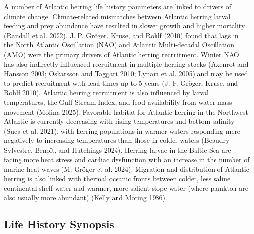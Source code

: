 \documentclass[
  letterpaper,
  DIV=11,
  numbers=noendperiod]{scrartcl}
\begin{document}
A number of Atlantic herring life history parameters are linked to
drivers of climate change. Climate-related mismatches between Atlantic
herring larval feeding and prey abundance have resulted in slower growth
and higher mortality (Randall et al. 2022). J. P. Gröger, Kruse, and
Rohlf (2010) found that lags in the North Atlantic Oscillation (NAO) and
Atlantic Multi-decadal Oscillation (AMO) were the primary drivers of
Atlantic herring recruitment. Winter NAO has also indirectly influenced
recruitment in multiple herring stocks (Axenrot and Hansson 2003;
Oskarsson and Taggart 2010; Lynam et al. 2005) and may be used to
predict recruitment with lead times up to 5 years (J. P. Gröger, Kruse,
and Rohlf 2010). Atlantic herring recruitment is also influenced by
larval temperatures, the Gulf Stream Index, and food availability from
water mass movement (Molina 2025). Favorable habitat for Atlantic
herring in the Northwest Atlantic is currently decreasing with rising
temperatures and bottom salinity (Suca et al. 2021), with herring
populations in warmer waters responding more negatively to increasing
temperatures than those in colder waters (Beaudry-Sylvestre, Benoît, and
Hutchings 2024). Herring larvae in the Baltic Sea are facing more heat
stress and cardiac dysfunction with an increase in the number of marine
heat waves (M. Gröger et al. 2024). Migration and distribution of
Atlantic herring is also linked with thermal oceanic fronts between
colder, less saline continental shelf water and warmer, more salient
slope water (where plankton are also usually more abundant) (Kelly and
Moring 1986).

\subsection{Life History Synopsis}\label{life-history-synopsis}
\end{document}
